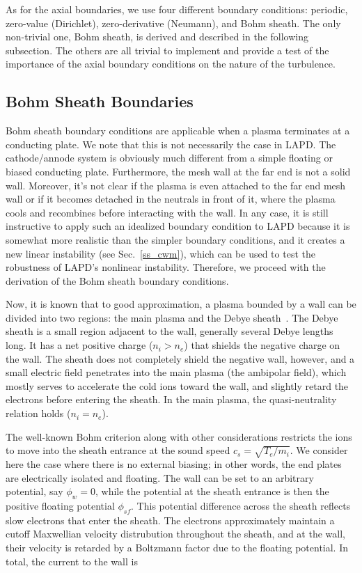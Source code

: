 As for the axial boundaries, we use four different boundary conditions: periodic, zero-value (Dirichlet), zero-derivative (Neumann), and Bohm sheath. 
The only non-trivial one, Bohm sheath, is derived and described in
the following subsection. The others are all trivial to implement and provide a test of the importance of the axial boundary conditions on the nature of the turbulence.

\subsection{Bohm Sheath Boundaries}
\label{ss_bs_bc}

Bohm sheath boundary conditions are applicable when a plasma terminates at a conducting plate. We note that this is not necessarily the case in LAPD. 
The cathode/annode system is obviously much different from a simple floating or biased conducting plate. Furthermore, the mesh wall at the far end is not a solid wall.
Moreover, it's not clear if the plasma is even attached to the far end mesh wall or if it becomes detached in the neutrals in front of it, where the plasma cools and recombines
before interacting with the wall. In any case, it is still instructive to apply such an idealized boundary condition to LAPD because it is somewhat more realistic
than the simpler boundary conditions, and it creates a new linear instability (see Sec.~\ref{ss_cwm}), which can be used to test the robustness of LAPD's nonlinear instability.
Therefore, we proceed with the derivation of the Bohm sheath boundary conditions.

Now, it is known that to good approximation, a plasma bounded by a wall can be divided into two regions: the main plasma and the Debye sheath~\cite{stangeby2000}. 
The Debye sheath is a small region adjacent to the wall, generally several Debye lengths long. It has a net positive charge ($n_i > n_e$) 
that shields the negative charge on the wall. The sheath does not completely shield the negative wall, however, and a small electric field penetrates into
the main plasma (the ambipolar field), which mostly serves to accelerate the cold ions toward the wall, and slightly retard the electrons before entering the sheath.
In the main plasma, the quasi-neutrality relation holds ($n_i = n_e$). 

The well-known Bohm criterion along with other considerations restricts the ions to move into the sheath entrance at the sound speed $c_s = \sqrt{T_e/m_i}$. 
We consider here the case where there is no external biasing; in other words, the end plates are electrically isolated and floating.
The wall can be set to an arbitrary potential, say $\phi_w = 0$, while the potential at the sheath entrance is then the positive 
floating potential $\phi_{sf}$. This potential difference across the sheath reflects slow electrons that enter the sheath.
The electrons approximately maintain a cutoff Maxwellian velocity distrubution throughout the sheath, and at the wall, 
their velocity is retarded by a Boltzmann factor due to the floating potential. 
In total, the current to the wall is~\cite{berk1991,berk1993,xu1993}

